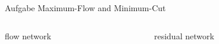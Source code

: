 \begin{frame}[allowframebreaks]{Aufgabe \thesection}{Maximum-Flow and Minimum-Cut}
\begin{solution}
\begin{columns}
\begin{column}{0.5\textwidth}
{\begin{minipage}[t]{14cm}
          \end{minipage}
        }
      \end{column}
    \end{columns}
  \end{solution}
  \begin{solution}
    \begin{columns}
      \begin{column}{0.5\textwidth}
      \end{column}
      \begin{column}{0.5\textwidth}
      \end{column}
    \end{columns}
  \end{solution}
  \begin{solutionnoinc}
    \begin{columns}
      \begin{column}{0.5\textwidth}
        \centering\scriptsize
        flow network
      \end{column}
      \begin{column}{0.5\textwidth}
        \centering\scriptsize
        residual network
      \end{column}
    \end{columns}
  \end{solutionnoinc}
  \begin{solutionnoinc}
    \begin{columns}
      \begin{column}{0.5\textwidth}
          \resizebox{\textwidth}{!}{
            \begin{minipage}[t]{14cm}


\end{minipage}}
\end{column}
\end{columns}
\end{solutionnoinc}
\end{frame}
